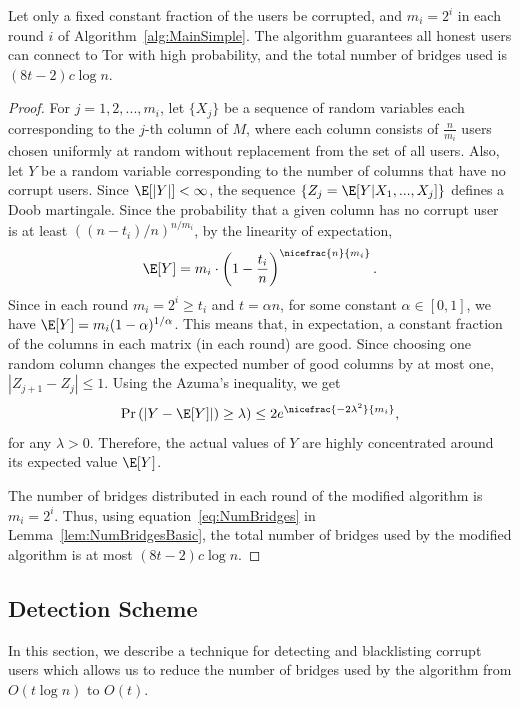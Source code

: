 \begin{lemma} \label{lem:azumaMatrix}
	Let only a fixed constant fraction of the users be corrupted, and ${m_i = 2^i}$ in each round $i$ of Algorithm~\ref{alg:MainSimple}. The algorithm guarantees all honest users can connect to Tor with high probability, and the total number of bridges used is ${(8t - 2)c\log{n}}$.
\end{lemma}
\begin{proof}
	For $j=1,2,...,m_i$, let $\{X_j\}$ be a sequence of random variables each corresponding to the $j$-th column of $M$, where each column consists of $\frac{n}{m_i}$ users chosen uniformly at random without replacement from the set of all users. Also, let $Y$ be a random variable corresponding to the number of columns that have no corrupt users. Since $\E[|Y|] < \infty$, the sequence $\{Z_j = \E[Y|X_1,...,X_j]\}$ defines a Doob martingale. Since the probability that a given column has no corrupt user is at least $\left((n-t_i)/n\right)^{n/m_i}$, by the linearity of expectation, \[\E[Y] = m_i \cdot \left(1-\frac{t_i}{n}\right)^{\nicefrac{n}{m_i}}.\]
	Since in each round ${m_i = 2^i \geq t_i}$ and ${t = \alpha n}$, for some constant ${\alpha \in [0,1]}$, we have ${\E[Y] = m_i(1-\alpha)^{1/\alpha}}$. This means that, in expectation, a constant fraction of the columns in each matrix (in each round) are good.
	Since choosing one random column changes the expected number of good columns by at most one, ${|Z_{j+1} - Z_j| \leq 1}$. Using the Azuma's inequality, we get 
	\[\Pr\left(|Y-\E[Y]|\right) \geq \lambda) \leq 2e^{\nicefrac{-2\lambda^2}{m_i}},\] 
	for any ${\lambda > 0}$.
	Therefore, the actual values of $Y$ are highly concentrated around its expected value $\E[Y]$.
	
	The number of bridges distributed in each round of the modified algorithm is ${m_i=2^i}$. Thus, using equation~\eqref{eq:NumBridges} in Lemma~\ref{lem:NumBridgesBasic}, the total number of bridges used by the modified algorithm is at most ${(8t - 2)c\log{n}}$.
\end{proof}

\subsection{Detection Scheme} \label{sec:Fixed}
In this section, we describe a technique for detecting and blacklisting corrupt users which allows us to reduce the number of bridges used by the algorithm from $O(t\log{n})$ to $O(t)$.

